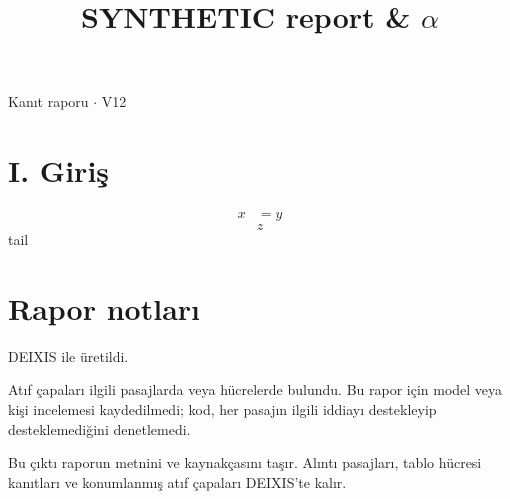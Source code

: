 \documentclass[journal]{IEEEtran}
\begin{document}
\renewcommand{\abstractname}{Özet}
\renewcommand{\IEEEkeywordsname}{Dizin Terimleri}
\renewcommand{\refname}{Kaynaklar}

\title{SYNTHETIC report \& \ensuremath{\alpha}}

\maketitle

\noindent Kanıt raporu \ensuremath{\cdot} V12

\section*{I. Giriş}

\begin {align}x&=y\end {align}
\cite{Synth26}
\begin{equation*}
z
\end{equation*}
tail \cite{Synth26}

\section*{Rapor notları}

DEIXIS ile üretildi.

Atıf çapaları ilgili pasajlarda veya hücrelerde bulundu. Bu rapor için model veya kişi incelemesi kaydedilmedi; kod, her pasajın ilgili iddiayı destekleyip desteklemediğini denetlemedi.

Bu çıktı raporun metnini ve kaynakçasını taşır. Alıntı pasajları, tablo hücresi kanıtları ve konumlanmış atıf çapaları DEIXIS'te kalır.




\end{document}

